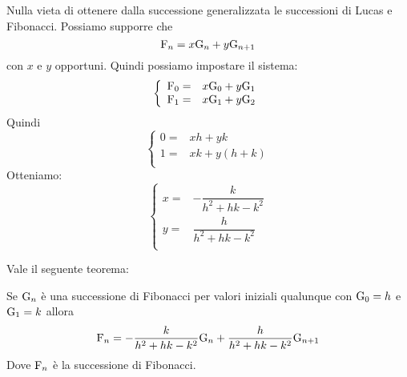 Nulla vieta di ottenere dalla successione generalizzata le successioni di Lucas 
e Fibonacci.
Possiamo supporre che \begin{equation*}
	\mathrm{F}_{n}=x\mathrm{G}_{n}+y\mathrm{G}_{n+1}
\end{equation*}
con $x$ e $y$ opportuni. Quindi possiamo impostare il sistema:
\begin{equation*}
	\left\{
	\begin{array}{ll}
		\mathrm{F}_{0}=&x\mathrm{G}_{0}+y\mathrm{G}_{1}\\
		\mathrm{F}_{1}=&x\mathrm{G}_{1}+y\mathrm{G}_{2}\\
	\end{array}
	\right.
\end{equation*}
Quindi
\begin{equation*}
	\left\{
	\begin{array}{ll}
	0=&xh+yk\\
	1=&xk+y(h+k)\\
	\end{array}
	\right.
\end{equation*}
Otteniamo:
\begin{equation*}
	\left\{
	\begin{array}{ll}
		x=&-\dfrac{k}{h^2+hk-k^2}\\
	y=&\dfrac{h}{h^2+hk-k^2}\\
	\end{array}
	\right.
\end{equation*}

Vale il seguente teorema:
\begin{thm}
	Se $\mathrm{G}_{n}$ è una successione di Fibonacci per valori iniziali qualunque  
	con $\mathrm{G}_{0}=h$ 
	e $\mathrm{G}_{1}=k $ allora
	\begin{equation}
		\mathrm{F}_{n}=-\dfrac{k}{h^2+hk-k^2}\mathrm{G}_{n}+\dfrac{h}{h^2+hk-k^2}\mathrm{G}_{n+1}
	\end{equation}\label{thm:GenDerFib}
	Dove $\mathrm{F}_{n}$ è la successione di Fibonacci.
\end{thm}~\cite{Rabinowitz_1996}

